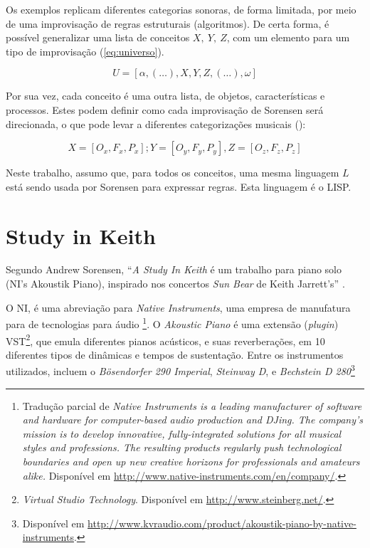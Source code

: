 \documentclass[
	12pt,				%
	openright,			%
	twoside,			%
	a4paper,			%
	english,			%
	french,				%
	spanish,			%
        italian,                        %
	brazil				%
	]{abntex2}
\begin{document}
Os exemplos replicam diferentes categorias sonoras, de forma limitada, por meio de uma improvisação de regras estruturais (algoritmos). De certa forma, é possível generalizar uma lista de conceitos $X,~Y,~Z$, com um elemento para um tipo de improvisação (\autoref{eq:universo}).

\begin{equation}
U = [\alpha, (\ldots), X, Y, Z, (\ldots), \omega]
\end{equation}\label{eq:universo}

Por sua vez, cada conceito é uma outra lista, de objetos, características e processos. Estes podem definir como cada improvisação de Sorensen será direcionada, o que pode levar a diferentes categorizações musicais (\label{eq:conceitos}):

\begin{equation}
X = [O_x, F_x, P_x]; Y = [O_y, F_y, P_y], Z = [O_z, F_z, P_z]
\end{equation}\label{eq:conceitos}

Neste trabalho, assumo que, para todos os conceitos, uma mesma linguagem $L$ está sendo usada por Sorensen para expressar regras. Esta linguagem é o LISP.

\section{Study in Keith}\label{sec:studyinkeith}

Segundo Andrew Sorensen, ``\emph{A Study In Keith} é um trabalho para piano solo (NI's Akoustik Piano), inspirado nos concertos \emph{Sun Bear} de Keith Jarrett's'' \cite{sorensen_keith_2009}.

O NI, é uma abreviação para \emph{Native Instruments}, uma empresa de manufatura para  de tecnologias para áudio \footnote{Tradução parcial  de \emph{Native Instruments is a leading manufacturer of software and hardware for computer-based audio production and DJing. The company's mission is to develop innovative, fully-integrated solutions for all musical styles and professions. The resulting products regularly push technological boundaries and open up new creative horizons for professionals and amateurs alike.} Disponível em \url{http://www.native-instruments.com/en/company/}.}. O \emph{Akoustic Piano} é uma extensão (\emph{plugin}) VST\footnote{\emph{Virtual Studio Technology}. Disponível em \url{http://www.steinberg.net/}.}, que emula diferentes pianos acústicos, e suas reverberações, em 10 diferentes tipos de dinâmicas e tempos de sustentação. Entre os instrumentos utilizados, incluem o \emph{Bösendorfer 290 Imperial}, \emph{Steinway D}, e \emph{Bechstein D 280}\footnote{Disponível em \url{http://www.kvraudio.com/product/akoustik-piano-by-native-instruments}.}
\end{document}
